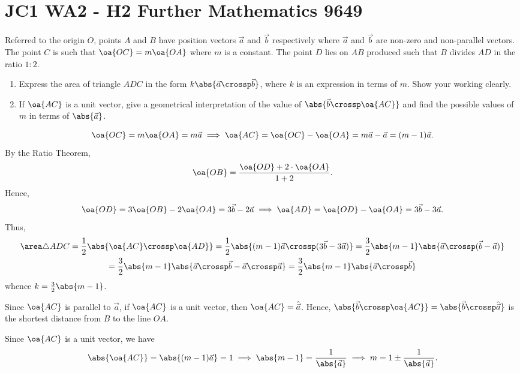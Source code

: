 \section{JC1 WA2 - H2 Further Mathematics 9649}

\begin{problem}
    Referred to the origin $O$, points $A$ and $B$ have position vectors $\vec a$ and $\vec b$ respectively where $\vec a$ and $\vec b$ are non-zero and non-parallel vectors. The point $C$ is such that $\oa{OC} = m \oa{OA}$ where $m$ is a constant. The point $D$ lies on $AB$ produced such that $B$ divides $AD$ in the ratio $1 : 2$.

    \begin{enumerate}
        \item Express the area of triangle $ADC$ in the form $k \abs{\vec a \crossp \vec b}$, where $k$ is an expression in terms of $m$. Show your working clearly.
        \item If $\oa{AC}$ is a unit vector, give a geometrical interpretation of the value of $\abs{\vec b \crossp \oa{AC}}$ and find the possible values of $m$ in terms of $\abs{\vec a}$.
    \end{enumerate}
\end{problem}
\begin{solution}
    \begin{ppart}
        \[\oa{OC} = m\oa{OA} = m \vec a \implies \oa{AC} = \oa{OC} - \oa{OA} = m \vec a - \vec a = (m-1) \vec a.\] By the Ratio Theorem, \[\oa{OB} = \frac{\oa{OD} + 2 \cdot \oa{OA}}{1 + 2}.\] Hence, \[\oa{OD} = 3\oa{OB} - 2\oa{OA} = 3\vec b - 2 \vec a \implies \oa{AD} = \oa{OD} - \oa{OA} = 3\vec b - 3\vec a.\] Thus,
        \begin{gather*}
            \area \triangle ADC = \frac12 \abs{\oa{AC} \crossp \oa{AD}} = \frac12 \abs{(m-1)\vec a \crossp (3\vec b - 3\vec a)} = \frac32 \abs{m-1} \abs{\vec a \crossp (\vec b - \vec a)}\\
            = \frac32 \abs{m-1} \abs{\vec a \crossp \vec b - \vec a \crossp \vec a} = \frac32 \abs{m-1} \abs{\vec a \crossp \vec b}
        \end{gather*}
        whence $k = \frac32 \abs{m-1}$.
    \end{ppart}
    \begin{ppart}
        Since $\oa{AC}$ is parallel to $\vec a$, if $\oa{AC}$ is a unit vector, then $\oa{AC} = \hat{\vec a}$. Hence, $\abs{\vec b \crossp \oa{AC}} = \abs{\vec b \crossp \hat{\vec a}}$ is the shortest distance from $B$ to the line $OA$.

        Since $\oa{AC}$ is a unit vector, we have \[\abs{\oa{AC}} = \abs{(m-1) \vec a} = 1 \implies \abs{m-1} = \frac1{\abs{\vec a}} \implies m = 1 \pm \frac1{\abs{\vec a}}.\]
    \end{ppart}
\end{solution}

